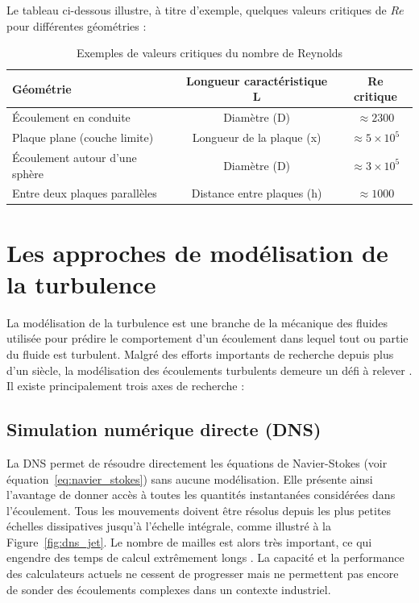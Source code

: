 Le tableau ci-dessous illustre, à titre d'exemple, quelques valeurs critiques de $Re$ pour différentes géométries :

\begin{table}[H]
    \centering
    \caption{Exemples de valeurs critiques du nombre de Reynolds}
    \label{tab:reynolds_critique}
    \begin{tabular}{|l|c|c|}
        \hline
        \textbf{Géométrie} & \textbf{Longueur caractéristique L} & \textbf{Re critique} \\
        \hline
        Écoulement en conduite & Diamètre (D) & $\approx 2300$ \\
        \hline
        Plaque plane (couche limite) & Longueur de la plaque (x) & $\approx 5\times10^5$ \\
        \hline
        Écoulement autour d'une sphère & Diamètre (D) & $\approx 3\times10^5$ \\
        \hline
        Entre deux plaques parallèles & Distance entre plaques (h) & $\approx 1000$ \\
        \hline
    \end{tabular}
\end{table}

\section{Les approches de modélisation de la turbulence}
\label{sec:approches_turbulence}

La modélisation de la turbulence est une branche de la mécanique des fluides utilisée pour prédire le comportement d'un écoulement dans lequel tout ou partie du fluide est turbulent. Malgré des efforts importants de recherche depuis plus d'un siècle, la modélisation des écoulements turbulents demeure un défi à relever \cite{wilcox2006turbulence}. Il existe principalement trois axes de recherche : \cite{sagaut2006large}

\subsection{Simulation numérique directe (DNS)}
\label{subsec:dns}

La DNS permet de résoudre directement les équations de Navier-Stokes (voir équation~\eqref{eq:navier_stokes}) sans aucune modélisation. Elle présente ainsi l'avantage de donner accès à toutes les quantités instantanées considérées dans l'écoulement. Tous les mouvements doivent être résolus depuis les plus petites échelles dissipatives jusqu'à l'échelle intégrale, comme illustré à la Figure~\ref{fig:dns_jet}. Le nombre de mailles est alors très important, ce qui engendre des temps de calcul extrêmement longs \cite{moin1998direct}. La capacité et la performance des calculateurs actuels ne cessent de progresser mais ne permettent pas encore de sonder des écoulements complexes dans un contexte industriel.

